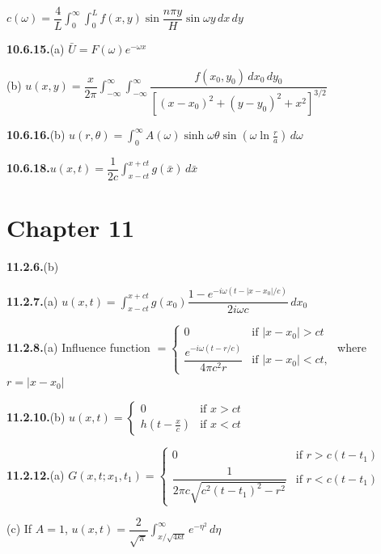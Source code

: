 $c(\omega) = \dfrac{4}{L}\int_0^{\infty}\int_0^L f(x,y)\sin\dfrac{n\pi y}{H}\sin\omega y\,dx\,dy$%

\medskip
\textbf{10.6.15.}\quad (a) $\bar{U} = F(\omega)e^{-\omega x}$

\quad (b) $u(x,y) = \dfrac{x}{2\pi}\int_{-\infty}^{\infty}\int_{-\infty}^{\infty}\dfrac{f(x_0,y_0)\,dx_0\,dy_0}{[(x-x_0)^2+(y-y_0)^2+x^2]^{3/2}}$%

\medskip
\textbf{10.6.16.}\quad (b) $u(r,\theta) = \int_0^{\infty}A(\omega)\sinh\omega\theta\sin\left(\omega\ln\frac{r}{a}\right)\,d\omega$%

\medskip
\textbf{10.6.18.}\quad $u(x,t) = \dfrac{1}{2c}\int_{x-ct}^{x+ct}g(\bar{x})\,d\bar{x}$

\section*{Chapter 11}

\textbf{11.2.6.}\quad (b) %

\medskip
\textbf{11.2.7.}\quad (a) $u(x,t) = \int_{x-ct}^{x+ct}g(x_0)\dfrac{1-e^{-i\omega(t-|x-x_0|/c)}}{2i\omega c}\,dx_0$

\medskip
\textbf{11.2.8.}\quad (a) Influence function $= \begin{cases} 0 & \text{if } |x-x_0| > ct \\[4pt] \dfrac{e^{-i\omega(t-r/c)}}{4\pi c^2 r} & \text{if } |x-x_0| < ct, \end{cases}$ where $r = |x-x_0|$

\medskip
\textbf{11.2.10.}\quad (b) $u(x,t) = \begin{cases} 0 & \text{if } x > ct \\ h\left(t - \frac{x}{c}\right) & \text{if } x < ct \end{cases}$

\medskip
\textbf{11.2.12.}\quad (a) $G(x,t;x_1,t_1) = \begin{cases} 0 & \text{if } r > c(t-t_1) \\[4pt] \dfrac{1}{2\pi c\sqrt{c^2(t-t_1)^2-r^2}} & \text{if } r < c(t-t_1) \end{cases}$

\quad (c) If $A=1$, $u(x,t) = \dfrac{2}{\sqrt{\pi}}\int_{x/\sqrt{4kt}}^{\infty}e^{-\eta^2}\,d\eta$

